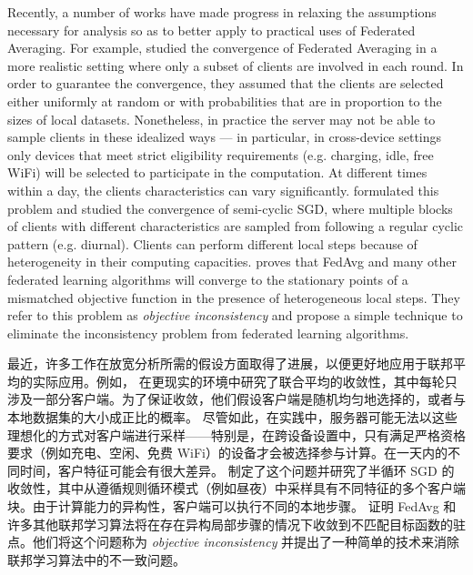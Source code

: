 Recently, a number of works have made progress in relaxing the assumptions necessary for analysis so as to better apply to practical uses of Federated Averaging. For example, \citet{li2019convergence} studied the convergence of Federated Averaging in a more realistic setting where only a subset of clients are involved in each round. In order to guarantee the convergence, they assumed that the clients are selected either uniformly at random or with probabilities that are in proportion to the sizes of local datasets. %
Nonetheless, in practice the server may not be able to sample clients in these idealized ways --- in particular, in cross-device settings only devices that meet strict eligibility requirements (e.g. charging, idle, free WiFi) will be selected to participate in the computation. At different times within a day, the clients characteristics can vary significantly. \citet{eichner19semicyclic} formulated this problem and studied the convergence of semi-cyclic SGD, where multiple blocks of clients with different characteristics are sampled from following a regular cyclic pattern (e.g. diurnal). Clients can perform different local steps because of heterogeneity in their computing capacities. \citet{wang2020tackling} proves that FedAvg and many other federated learning algorithms will converge to the stationary points of a mismatched objective function in the presence of heterogeneous local steps. They refer to this problem as \emph{objective inconsistency} and propose a simple technique to eliminate the inconsistency problem from federated learning algorithms.

最近，许多工作在放宽分析所需的假设方面取得了进展，以便更好地应用于联邦平均的实际应用。例如，\citet{li2019convergence} 在更现实的环境中研究了联合平均的收敛性，其中每轮只涉及一部分客户端。为了保证收敛，他们假设客户端是随机均匀地选择的，或者与本地数据集的大小成正比的概率。 %
尽管如此，在实践中，服务器可能无法以这些理想化的方式对客户端进行采样——特别是，在跨设备设置中，只有满足严格资格要求（例如充电、空闲、免费 WiFi）的设备才会被选择参与计算。在一天内的不同时间，客户特征可能会有很大差异。 \citet{eichner19semicyclic} 制定了这个问题并研究了半循环 SGD 的收敛性，其中从遵循规则循环模式（例如昼夜）中采样具有不同特征的多个客户端块。由于计算能力的异构性，客户端可以执行不同的本地步骤。 \citet{wang2020tackling} 证明 FedAvg 和许多其他联邦学习算法将在存在异构局部步骤的情况下收敛到不匹配目标函数的驻点。他们将这个问题称为 \emph {objective inconsistency} 并提出了一种简单的技术来消除联邦学习算法中的不一致问题。

